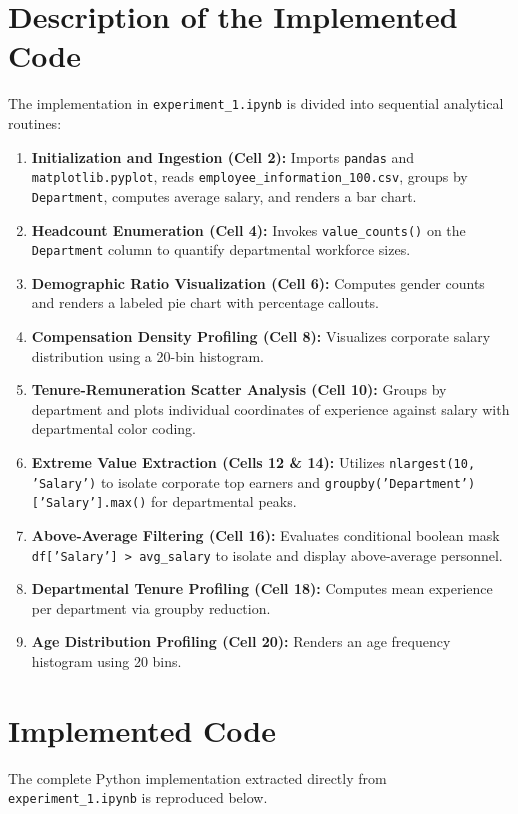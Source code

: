 \documentclass[12pt,a4paper]{report}
\begin{document}
\section{Description of the Implemented Code}
The implementation in \texttt{experiment\_1.ipynb} is divided into sequential analytical routines:
\begin{enumerate}
    \item \textbf{Initialization and Ingestion (Cell 2):} Imports \texttt{pandas} and \texttt{matplotlib.pyplot}, reads \texttt{employee\_information\_100.csv}, groups by \texttt{Department}, computes average salary, and renders a bar chart.
    \item \textbf{Headcount Enumeration (Cell 4):} Invokes \texttt{value\_counts()} on the \texttt{Department} column to quantify departmental workforce sizes.
    \item \textbf{Demographic Ratio Visualization (Cell 6):} Computes gender counts and renders a labeled pie chart with percentage callouts.
    \item \textbf{Compensation Density Profiling (Cell 8):} Visualizes corporate salary distribution using a 20-bin histogram.
    \item \textbf{Tenure-Remuneration Scatter Analysis (Cell 10):} Groups by department and plots individual coordinates of experience against salary with departmental color coding.
    \item \textbf{Extreme Value Extraction (Cells 12 \& 14):} Utilizes \texttt{nlargest(10, 'Salary')} to isolate corporate top earners and \texttt{groupby('Department')['Salary'].max()} for departmental peaks.
    \item \textbf{Above-Average Filtering (Cell 16):} Evaluates conditional boolean mask \texttt{df['Salary'] > avg\_salary} to isolate and display above-average personnel.
    \item \textbf{Departmental Tenure Profiling (Cell 18):} Computes mean experience per department via groupby reduction.
    \item \textbf{Age Distribution Profiling (Cell 20):} Renders an age frequency histogram using 20 bins.
\end{enumerate}

\section{Implemented Code}
The complete Python implementation extracted directly from \texttt{experiment\_1.ipynb} is reproduced below.
\end{document}
